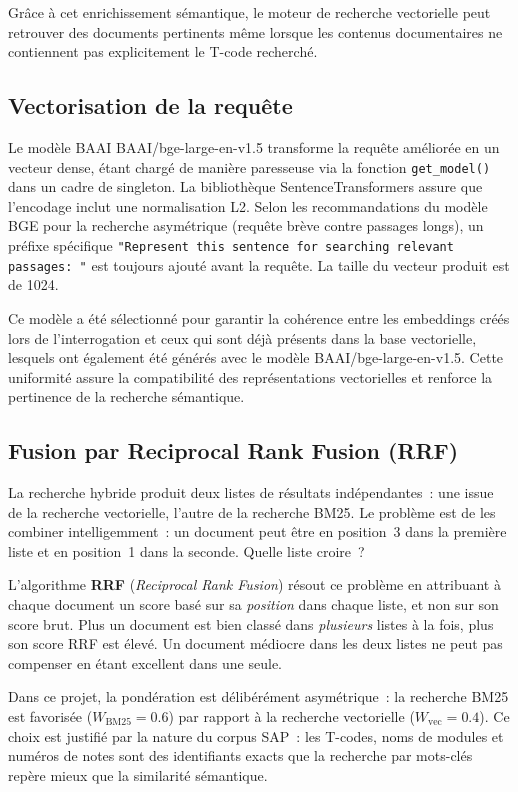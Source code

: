 Grâce à cet enrichissement sémantique, le moteur de recherche vectorielle peut retrouver des documents pertinents même lorsque les contenus documentaires ne contiennent pas explicitement le T-code recherché.

\subsection{Vectorisation de la requête}
Le modèle BAAI BAAI/bge-large-en-v1.5 transforme la requête améliorée en un vecteur dense, étant chargé de manière paresseuse via la fonction \texttt{get\_model()} dans un cadre de singleton. La bibliothèque SentenceTransformers assure que l'encodage inclut une normalisation L2. Selon les recommandations du modèle BGE pour la recherche asymétrique (requête brève contre passages longs), un préfixe spécifique \texttt{"Represent this sentence for searching relevant passages: "} est toujours ajouté avant la requête. La taille du vecteur produit est de 1024.

Ce modèle a été sélectionné pour garantir la cohérence entre les embeddings créés lors de l'interrogation et ceux qui sont déjà présents dans la base vectorielle, lesquels ont également été générés avec le modèle BAAI/bge-large-en-v1.5. Cette uniformité assure la compatibilité des représentations vectorielles et renforce la pertinence de la recherche sémantique.





\subsection{Fusion par Reciprocal Rank Fusion (RRF)}

La recherche hybride produit deux listes de résultats indépendantes~: une issue de la recherche vectorielle, l'autre de la recherche BM25. Le problème est de les combiner intelligemment~: un document peut être en position~3 dans la première liste et en position~1 dans la seconde. Quelle liste croire~?

L'algorithme \textbf{RRF} (\textit{Reciprocal Rank Fusion}) résout ce problème en attribuant à chaque document un score basé sur sa \emph{position} dans chaque liste, et non sur son score brut. Plus un document est bien classé dans \emph{plusieurs} listes à la fois, plus son score RRF est élevé. Un document médiocre dans les deux listes ne peut pas compenser en étant excellent dans une seule.

Dans ce projet, la pondération est délibérément asymétrique~: la recherche BM25 est favorisée ($W_{\text{BM25}} = 0.6$) par rapport à la recherche vectorielle ($W_{\text{vec}} = 0.4$). Ce choix est justifié par la nature du corpus SAP~: les T-codes, noms de modules et numéros de notes sont des identifiants exacts que la recherche par mots-clés repère mieux que la similarité sémantique.

